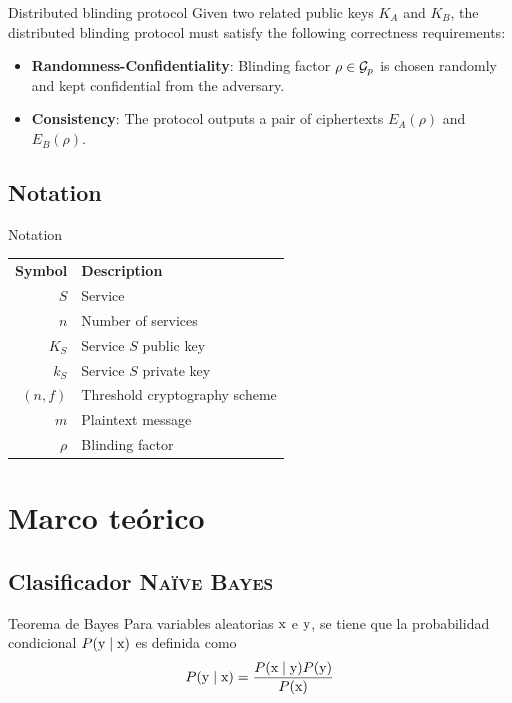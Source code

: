 \documentclass[10pt]{beamer}
\begin{document}
\begin{frame}{Distributed blinding protocol}
  Given two related public keys $K_A$ and $K_B$, the distributed blinding protocol must satisfy the following correctness requirements:
  \begin{itemize}
  \item \textbf{Randomness-Confidentiality}: Blinding factor $\rho\in{\mathcal{G}}_p$ is chosen randomly and kept confidential from the adversary.
  \item \textbf{Consistency}: The protocol outputs a pair of ciphertexts $E_A(\rho)$ and $E_B(\rho)$.
  \end{itemize}
\end{frame}


\subsection{Notation}
\begin{frame}{Notation}
  \begin{center}
    \begin{tabular}{rl}
      \textbf{Symbol} & \textbf{Description} \\
      $S$ & Service \\
      $n$ & Number of services \\
      $K_S$ & Service $S$ public key \\
      $k_S$ & Service $S$ private key \\
      $(n, f)$ & Threshold cryptography scheme \\
      $m$ & Plaintext message \\
      $\rho$ & Blinding factor \\
    \end{tabular}
  \end{center}
\end{frame}


\section{Marco teórico}

\subsection{Clasificador \textsc{Na\"ive Bayes}}
\begin{frame}{Teorema de Bayes}
  Para variables aleatorias ${\textnormal{x}}$ e ${\textnormal{y}}$, se tiene que la probabilidad condicional $P({\textnormal{y}} \mid {\textnormal{x}})$ es definida como
  \begin{equation*}
    P({\textnormal{y}} \mid {\textnormal{x}}) = \frac{P({\textnormal{x}} \mid {\textnormal{y}}) P({\textnormal{y}})}{P({\textnormal{x}})}
  \end{equation*}
\end{frame}
\end{document}
